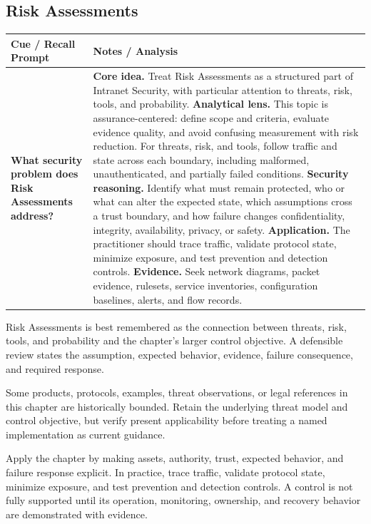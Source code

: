 \documentclass[11pt]{article}
\newcommand{\CornellHeader}{%
\rowcolor{Navy}\color{white}\bfseries Cue / Recall Prompt & \color{white}\bfseries Notes / Analysis\\\hline}
\newcommand{\CornellRow}[2]{%
\cellcolor{CueGray}\RaggedRight\textbf{#1} & \RaggedRight #2\\\hline}
\begin{document}
\subsection*{Risk Assessments}
\begin{longtable}{>{\RaggedRight\arraybackslash}p{}|>{\RaggedRight\arraybackslash}p{}}
\CornellHeader
\CornellRow{What security problem does Risk Assessments address?}{\textbf{Core idea.} Treat Risk Assessments as a structured part of Intranet Security, with particular attention to threats, risk, tools, and probability. \textbf{Analytical lens.} This topic is assurance-centered: define scope and criteria, evaluate evidence quality, and avoid confusing measurement with risk reduction. For threats, risk, and tools, follow traffic and state across each boundary, including malformed, unauthenticated, and partially failed conditions. \textbf{Security reasoning.} Identify what must remain protected, who or what can alter the expected state, which assumptions cross a trust boundary, and how failure changes confidentiality, integrity, availability, privacy, or safety. \textbf{Application.} The practitioner should trace traffic, validate protocol state, minimize exposure, and test prevention and detection controls. \textbf{Evidence.} Seek network diagrams, packet evidence, rulesets, service inventories, configuration baselines, alerts, and flow records.}
\end{longtable}
\begin{topicsummary}
Risk Assessments is best remembered as the connection between threats, risk, tools, and probability and the chapter's larger control objective. A defensible review states the assumption, expected behavior, evidence, failure consequence, and required response.
\end{topicsummary}
\begin{historybox}
Some products, protocols, examples, threat observations, or legal references in this chapter are historically bounded. Retain the underlying threat model and control objective, but verify present applicability before treating a named implementation as current guidance.
\end{historybox}
\begin{defensebox}
Apply the chapter by making assets, authority, trust, expected behavior, and failure response explicit. In practice, trace traffic, validate protocol state, minimize exposure, and test prevention and detection controls. A control is not fully supported until its operation, monitoring, ownership, and recovery behavior are demonstrated with evidence.
\end{defensebox}
\end{document}
